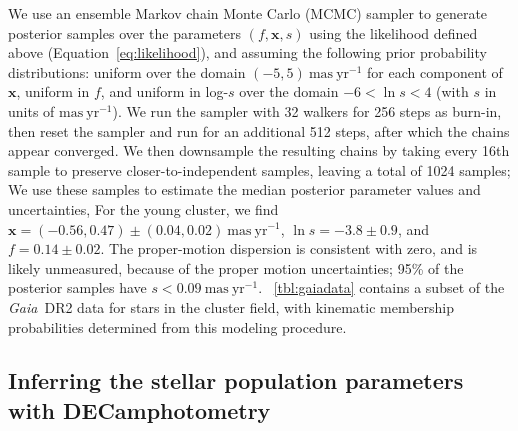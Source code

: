 \documentclass[twocolumn]{aastex62}
\newcommand{\acronym}[1]{{\small{#1}}}
\newcommand{\gaia}{\textsl{Gaia}}
\newcommand{\decam}{DECam}
\newcommand{\DR}[1]{\acronym{DR#1}}
\newcommand{\bs}[1]{\boldsymbol{#1}}
\newcommand{\equationname}{Equation}
\newcommand{\masyr}{\ensuremath{\textrm{mas}~\textrm{yr}^{-1}}}
\begin{document}
We use an ensemble Markov chain Monte Carlo (MCMC) sampler \citep[\texttt{emcee};][]{emcee, Goodman:2010} to generate posterior samples over the parameters $(f, \bs{x}, s)$ using the likelihood defined above (\equationname~\ref{eq:likelihood}), and assuming the following prior probability distributions: uniform over the domain $(-5, 5)~\masyr$ for each component of $\bs{x}$, uniform in $f$, and uniform in log-$s$ over the domain $-6 < \ln s < 4$ (with $s$ in units of \masyr).
We run the sampler with 32 walkers for 256 steps as burn-in, then reset the sampler and run for an additional 512 steps, after which the chains appear converged.
We then downsample the resulting chains by taking every 16th sample to preserve closer-to-independent samples, leaving a total of 1024 samples; We use these samples to estimate the median posterior parameter values and uncertainties,
For the young cluster, we find $\bs{x} = (-0.56,  0.47) \pm (0.04, 0.02)~\masyr$, $\ln s = -3.8 \pm 0.9$, and $f = 0.14 \pm 0.02$.
The proper-motion dispersion is consistent with zero, and is likely unmeasured, because of the proper motion uncertainties; 95\% of the posterior samples have $s < 0.09~\masyr$.
\tablename~\ref{tbl:gaiadata} contains a subset of the \gaia\ \DR{2} data for stars in the cluster field, with kinematic membership probabilities determined from this modeling procedure.


\subsection{Inferring the stellar population parameters with \decam photometry}
\label{sec:popmodel}
\end{document}
